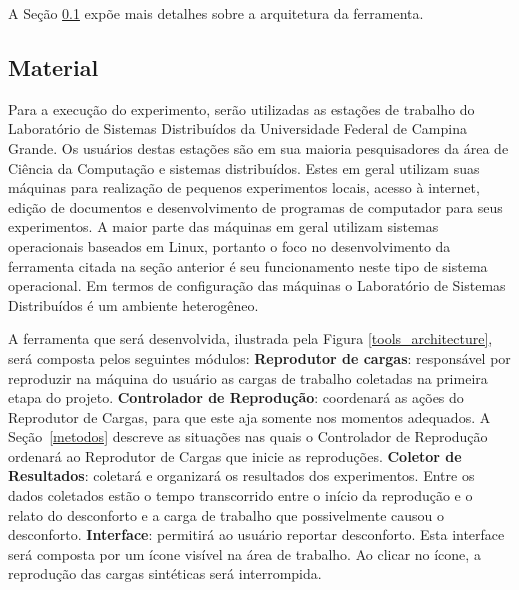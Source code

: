 \documentclass[a4paper,10pt]{article}
\begin{document}
A Seção \ref{material} expõe mais detalhes sobre a arquitetura da ferramenta.

\subsection{Material}
\label{material}

Para a execução do experimento, serão utilizadas as estações de trabalho do
Laboratório de Sistemas Distribuídos da Universidade Federal de Campina Grande.
Os usuários destas estações são em sua maioria pesquisadores da área de Ciência 
da Computação e sistemas distribuídos. Estes em geral utilizam suas máquinas
para realização de pequenos experimentos locais, acesso à internet, edição de
documentos e desenvolvimento de programas de computador para seus experimentos. 
A maior parte das máquinas em geral utilizam sistemas operacionais baseados em
Linux, portanto o foco no desenvolvimento da ferramenta citada na seção anterior
é seu funcionamento neste tipo de sistema operacional. Em termos de configuração
das máquinas o Laboratório de Sistemas Distribuídos é um ambiente heterogêneo.

A ferramenta que será desenvolvida, ilustrada pela Figura
\ref{tools_architecture}, será composta pelos seguintes módulos:\newline
\newline
\textbf{Reprodutor de cargas}: responsável por reproduzir na máquina do usuário
as cargas de trabalho coletadas na primeira etapa do projeto.\newline
\textbf{Controlador de Reprodução}: coordenará as ações do Reprodutor de Cargas,
para que este aja somente nos momentos adequados. A Seção~\ref{metodos} descreve
as situações nas quais o Controlador de Reprodução ordenará ao Reprodutor de
Cargas que inicie as reproduções.\newline
\textbf{Coletor de Resultados}: coletará e organizará os resultados dos
experimentos. Entre os dados coletados estão o tempo transcorrido entre o início
da reprodução e o relato do desconforto e a carga de trabalho que possivelmente
causou o desconforto.\newline
\textbf{Interface}: permitirá ao usuário reportar desconforto. Esta
interface será composta por um ícone visível na área de trabalho. Ao
clicar no ícone, a reprodução das cargas sintéticas será interrompida.\newline
\end{document}
